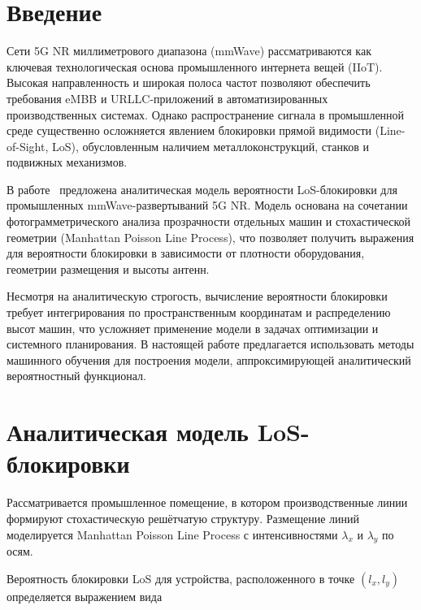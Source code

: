 \documentclass[%
]{ittmm}
\begin{document}
\maketitle

\section{Введение}

Сети 5G NR миллиметрового диапазона (mmWave) рассматриваются как ключевая технологическая основа промышленного интернета вещей (IIoT). 
Высокая направленность и широкая полоса частот позволяют обеспечить требования eMBB и URLLC-приложений в автоматизированных производственных системах. 
Однако распространение сигнала в промышленной среде существенно осложняется явлением блокировки прямой видимости (Line-of-Sight, LoS), обусловленным наличием металлоконструкций, станков и подвижных механизмов.

В работе~\cite{1} предложена аналитическая модель вероятности LoS-блокировки для промышленных mmWave-развертываний 5G NR. 
Модель основана на сочетании фотограмметрического анализа прозрачности отдельных машин и стохастической геометрии (Manhattan Poisson Line Process), что позволяет получить выражения для вероятности блокировки в зависимости от плотности оборудования, геометрии размещения и высоты антенн.

Несмотря на аналитическую строгость, вычисление вероятности блокировки требует интегрирования по пространственным координатам и распределению высот машин, что усложняет применение модели в задачах оптимизации и системного планирования. 
В настоящей работе предлагается использовать методы машинного обучения для построения модели, аппроксимирующей аналитический вероятностный функционал.

\section{Аналитическая модель LoS-блокировки}

Рассматривается промышленное помещение, в котором производственные линии формируют стохастическую решётчатую структуру. Размещение линий моделируется Manhattan Poisson Line Process с интенсивностями $\lambda_x$ и $\lambda_y$ по осям.

Вероятность блокировки LoS для устройства, расположенного в точке $(l_x, l_y)$ определяется выражением вида
\end{document}
